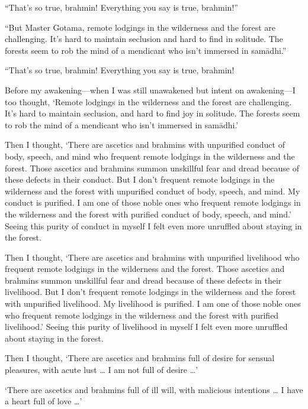 \documentclass[12pt,openany]{book}%
\begin{document}
“That’s so true, brahmin! Everything you say is true, brahmin!” 

“But Master Gotama, remote lodgings in the wilderness and the forest are challenging. It’s hard to maintain seclusion and hard to find in solitude. The forests seem to rob the mind of a mendicant who isn’t immersed in \textsanskrit{samādhi}.” 

“That’s so true, brahmin! Everything you say is true, brahmin! 

Before my awakening—when I was still unawakened but intent on awakening—I too thought, ‘Remote lodgings in the wilderness and the forest are challenging. It’s hard to maintain seclusion, and hard to find joy in solitude. The forests seem to rob the mind of a mendicant who isn’t immersed in \textsanskrit{samādhi}.’ 

Then I thought, ‘There are ascetics and brahmins with unpurified conduct of body, speech, and mind who frequent remote lodgings in the wilderness and the forest. Those ascetics and brahmins summon unskillful fear and dread because of these defects in their conduct. But I don’t frequent remote lodgings in the wilderness and the forest with unpurified conduct of body, speech, and mind. My conduct is purified. I am one of those noble ones who frequent remote lodgings in the wilderness and the forest with purified conduct of body, speech, and mind.’ Seeing this purity of conduct in myself I felt even more unruffled about staying in the forest. 

Then I thought, ‘There are ascetics and brahmins with unpurified livelihood who frequent remote lodgings in the wilderness and the forest. Those ascetics and brahmins summon unskillful fear and dread because of these defects in their livelihood. But I don’t frequent remote lodgings in the wilderness and the forest with unpurified livelihood. My livelihood is purified. I am one of those noble ones who frequent remote lodgings in the wilderness and the forest with purified livelihood.’ Seeing this purity of livelihood in myself I felt even more unruffled about staying in the forest. 

Then I thought, ‘There are ascetics and brahmins full of desire for sensual pleasures, with acute lust … I am not full of desire …’ 

‘There are ascetics and brahmins full of ill will, with malicious intentions … I have a heart full of love …’ 
\end{document}
